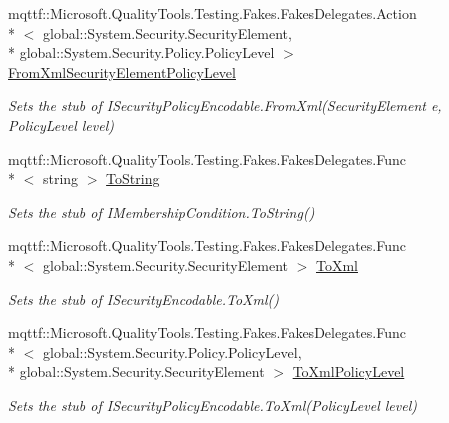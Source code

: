 \begin{DoxyCompactItemize}
mqttf\-::\-Microsoft.\-Quality\-Tools.\-Testing.\-Fakes.\-Fakes\-Delegates.\-Action\\*
$<$ global\-::\-System.\-Security.\-Security\-Element, \\*
global\-::\-System.\-Security.\-Policy.\-Policy\-Level $>$ \hyperlink{class_system_1_1_security_1_1_policy_1_1_fakes_1_1_stub_i_membership_condition_a128a0b1b14d5ab5fd6efdd2d209f32f6}{From\-Xml\-Security\-Element\-Policy\-Level}
\begin{DoxyCompactList}\small\item\em Sets the stub of I\-Security\-Policy\-Encodable.\-From\-Xml(\-Security\-Element e, Policy\-Level level)\end{DoxyCompactList}\item 
mqttf\-::\-Microsoft.\-Quality\-Tools.\-Testing.\-Fakes.\-Fakes\-Delegates.\-Func\\*
$<$ string $>$ \hyperlink{class_system_1_1_security_1_1_policy_1_1_fakes_1_1_stub_i_membership_condition_a7051e5632aecb901f5f6f701bbf1bf9e}{To\-String}
\begin{DoxyCompactList}\small\item\em Sets the stub of I\-Membership\-Condition.\-To\-String()\end{DoxyCompactList}\item 
mqttf\-::\-Microsoft.\-Quality\-Tools.\-Testing.\-Fakes.\-Fakes\-Delegates.\-Func\\*
$<$ global\-::\-System.\-Security.\-Security\-Element $>$ \hyperlink{class_system_1_1_security_1_1_policy_1_1_fakes_1_1_stub_i_membership_condition_a7decefb45885a8a820d3d4ca173550b5}{To\-Xml}
\begin{DoxyCompactList}\small\item\em Sets the stub of I\-Security\-Encodable.\-To\-Xml()\end{DoxyCompactList}\item 
mqttf\-::\-Microsoft.\-Quality\-Tools.\-Testing.\-Fakes.\-Fakes\-Delegates.\-Func\\*
$<$ global\-::\-System.\-Security.\-Policy.\-Policy\-Level, \\*
global\-::\-System.\-Security.\-Security\-Element $>$ \hyperlink{class_system_1_1_security_1_1_policy_1_1_fakes_1_1_stub_i_membership_condition_a3f2a7b29a20e8274b27d7070d46e20fe}{To\-Xml\-Policy\-Level}
\begin{DoxyCompactList}\small\item\em Sets the stub of I\-Security\-Policy\-Encodable.\-To\-Xml(\-Policy\-Level level)\end{DoxyCompactList}\end{DoxyCompactItemize}


